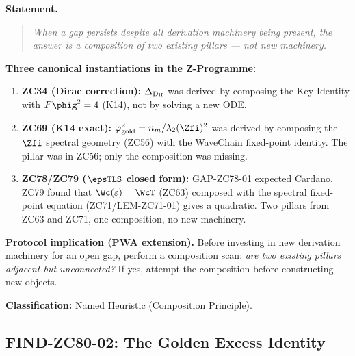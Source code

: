 \documentclass[12pt, a4paper]{article}
\begin{document}
\begin{derivedbox}[title={FIND-ZC80-01: The Composition Principle
  --- Named CRF Heuristic}]

\textbf{Statement.}
\begin{quote}
\emph{When a gap persists despite all derivation machinery
being present, the answer is a composition of two existing
pillars --- not new machinery.}
\end{quote}

\textbf{Three canonical instantiations in the Z-Programme:}

\begin{enumerate}[leftmargin=2em, noitemsep]
  \item \textbf{ZC34 (Dirac correction):}
    $\Delta_{\rm Dir}$ was derived by composing
    the Key Identity with $F\phig^2 = 4$ (K14),
    not by solving a new ODE.

  \item \textbf{ZC69 (K14 exact):}
    $\varphi_{\rm gold}^2 = n_m/\lambda_2(\Zfi)^2$
    was derived by composing the $\Zfi$ spectral
    geometry (ZC56) with the WaveChain fixed-point
    identity. The pillar was in ZC56; only the
    composition was missing.

  \item \textbf{ZC78/ZC79 ($\epsTLS$ closed form):}
    GAP-ZC78-01 expected Cardano.
    ZC79 found that $\Wc(\varepsilon)=\WcT$
    (ZC63) composed with the spectral fixed-point
    equation (ZC71/LEM-ZC71-01) gives a quadratic.
    Two pillars from ZC63 and ZC71, one composition,
    no new machinery.
\end{enumerate}

\textbf{Protocol implication (PWA extension).}
Before investing in new derivation machinery for an open gap,
perform a composition scan:
\textit{are two existing pillars adjacent but unconnected?}
If yes, attempt the composition before constructing new objects.

\textbf{Classification:} Named Heuristic (Composition Principle).
\end{derivedbox}

\subsection{FIND-ZC80-02: The Golden Excess Identity}
\label{sec:find02}
\end{document}
